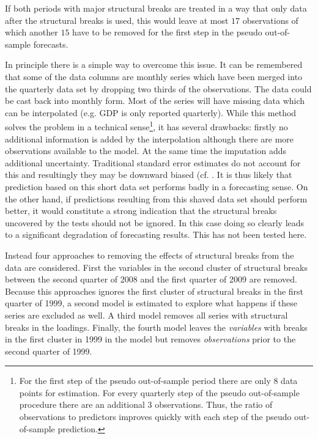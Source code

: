 \documentclass[12pt]{article}
\begin{document}
If both periods with major structural breaks are treated in a way that only data after the structural breaks is used, this would leave at most $17$ observations of which another $15$ have to be removed for the first step in the pseudo out-of-sample forecasts.

In principle there is a simple way to overcome this issue. It can be remembered that some of the data columns are monthly series which have been merged into the quarterly data set by dropping two thirds of the observations. The data could be cast back into monthly form. Most of the series will have missing data which can be interpolated (e.g. GDP is only reported quarterly). While this method solves the problem in a technical sense\footnote{For the first step of the pseudo out-of-sample period there are only $8$ data points for estimation. For every quarterly step of the pseudo out-of-sample procedure there are an additional $3$ observations. Thus, the ratio of observations to predictors improves quickly with each step of the pseudo out-of-sample prediction.}, it has several drawbacks: firstly no additional information is added by the interpolation although there are more observations available to the model. At the same time the imputation adds additional uncertainty. Traditional standard error estimates do not account for this and resultingly they may be downward biased (cf. \citet[chapter~25]{gelman2006missing}. It is thus likely that prediction based on this short data set performs badly in a forecasting sense. On the other hand, if predictions resulting from this shaved data set should perform better, it would constitute a strong indication that the structural breaks uncovered by the tests should not be ignored. In this case doing so clearly leads to a significant degradation of forecasting results. This has not been tested here. 

Instead four approaches to removing the effects of structural breaks from the data are considered. First the variables in the second cluster of structural breaks between the second quarter of 2008 and the first quarter of 2009 are removed. Because this approaches ignores the first cluster of structural breaks in the first quarter of 1999, a second model is estimated to explore what happens if these series are excluded as well. A third model removes all series with structural breaks in the loadings. Finally, the fourth model leaves the \textit{variables} with breaks in the first cluster in 1999 in the model but removes \textit{observations} prior to the second quarter of 1999. 
\end{document}

